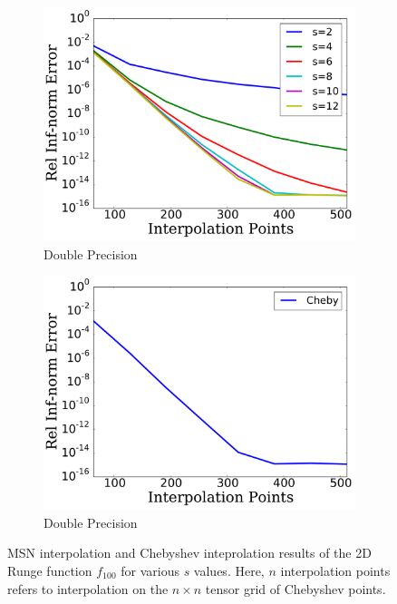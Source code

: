 \begin{figure}[p]
    \begin{subfigure}{0.45\textwidth}
    \includegraphics[width=\textwidth]{plots/msn_2n_fast_smooth_R_100_double.pdf}
    \caption{Double Precision}
    \end{subfigure}
    \begin{subfigure}{0.45\textwidth}
    \includegraphics[width=\textwidth]{plots/cheby_interp_smooth_R_100_double.pdf}
    \caption{Double Precision}
    \end{subfigure}
\caption[Smooth Interpolation Comparison: 2D Runge Function $R=100$]{
MSN interpolation and Chebyshev inteprolation results
of the 2D Runge function $f_{100}$ for various $s$ values.
Here, $n$ interpolation points refers to interpolation on the $n\times n$
tensor grid of Chebyshev points.
}
\label{fig:smooth_comparison_2d_runge_100}
\end{figure}



